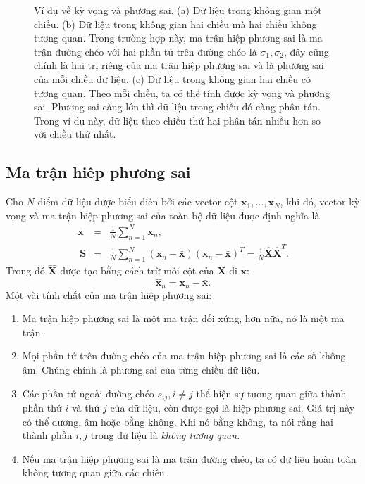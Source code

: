 \documentclass[12pt,a4paper,oneside]{report}
\numberwithin{equation}{section}
\begin{document}
\begin{figure}[t]
\begin{subfigure}{0.325\textwidth}
		\caption{}
		\label{fig:27_2c}
	\end{subfigure}
	\caption{
		Ví dụ về kỳ vọng và phương sai. (a) Dữ liệu trong không gian
		một chiều. (b) Dữ liệu trong không gian hai chiều mà hai chiều
		không tương quan. Trong trường hợp này, ma trận hiệp phương sai là ma trận
		đường chéo với hai phần tử trên đường chéo  là $\sigma_1, \sigma_2$, đây
		cũng chính là hai trị riêng của ma trận hiệp phương sai và là phương sai
		của mỗi chiều dữ liệu. (c) Dữ liệu trong không gian hai chiều có tương
		quan. Theo mỗi chiều, ta có thể tính được kỳ vọng và phương sai. Phương sai
		càng lớn thì dữ liệu trong chiều đó càng phân tán. Trong ví dụ này, dữ liệu
		theo chiều thứ hai phân tán nhiều hơn so với chiều thứ nhất. }
	\label{fig:27_2}
\end{figure}

\subsection{Ma trận hiêp phương sai}

Cho $N$ điểm dữ liệu được biểu diễn bởi các vector cột $\mathbf{x}_1, \dots, \mathbf{x}_N$, khi đó, {vector kỳ vọng} và {ma trận hiệp phương sai} của toàn bộ dữ liệu được định nghĩa là
\begin{eqnarray} 
	\bar{\mathbf{x}} &=& \frac{1}{N} \sum_{n=1}^N \mathbf{x}_n, \\\ 
	\mathbf{S} &=&  \frac{1}{N}\sum_{n=1}^N (\mathbf{x}_n - \bar{\mathbf{x}})(\mathbf{x}_n - \bar{\mathbf{x}})^T = \frac{1}{N}\hat{\mathbf{X}}\hat{\mathbf{X}}^T.
\end{eqnarray} 
Trong đó $\hat{\mathbf{X}}$ được tạo bằng cách trừ mỗi cột của $\mathbf{X}$ đi $\bar{\mathbf{x}}$: 
\begin{equation} 
	\hat{\mathbf{x}}_n = \mathbf{x}_n - \bar{\mathbf{x}}.
\end{equation} 
\newpage 
Một vài tính chất của ma trận hiệp phương sai: 
\begin{enumerate}
	
	\item Ma trận hiệp phương sai là một ma trận đối xứng, hơn nữa, nó là một ma trận.
	
	\item Mọi phần tử trên đường chéo của ma trận hiệp phương sai là các số không âm. Chúng chính là phương sai của từng chiều dữ liệu. 
	
	\item Các phần tử ngoài đường chéo $s_{ij}, i \neq j$ thể hiện sự tương quan
	giữa thành phần thứ $i$ và thứ $j$ của dữ liệu, còn được gọi là hiệp phương
	sai. Giá trị này có thể dương, âm hoặc bằng không. Khi nó bằng không, ta nói
	rằng hai thành phần $i, j$ trong dữ liệu là \textit{không tương quan}.
	
	\item Nếu ma trận hiệp phương sai là ma trận đường chéo, ta có dữ liệu hoàn toàn không tương quan giữa các chiều. 
\end{enumerate}
\end{document}
